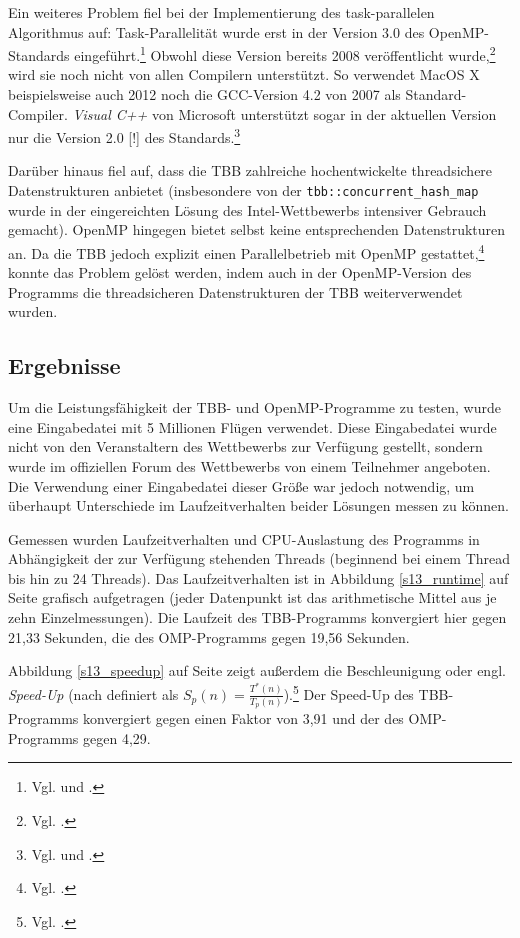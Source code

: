\documentclass[11pt]{scrartcl}
\begin{document}
Ein weiteres Problem fiel bei der Implementierung des task-parallelen Algorithmus auf: Task-Parallelität wurde erst in
der Version 3.0 des OpenMP-Standards eingeführt.\footnote{Vgl. \cite[S.~134]{openmp08} und
\cite[S.~406ff]{ayguade_design_2009}.} Obwohl diese Version bereits 2008 veröffentlicht wurde,\footnote{Vgl.
\cite{openmp.org_openmp_2012}.} wird sie noch nicht von allen Compilern unterstützt. So verwendet MacOS X
beispielsweise auch 2012 noch die GCC-Version 4.2 von 2007 als Standard-Compiler. \emph{Visual C++} von Microsoft
unterstützt sogar in der aktuellen Version nur die Version 2.0 [!] des Standards.\footnote{Vgl.
\cite{openmp.org_openmp_2012-2} und
\cite{microsoft_openmp_2012}.}

Darüber hinaus fiel auf, dass die TBB zahlreiche hochentwickelte threadsichere Datenstrukturen anbietet (insbesondere
von der \texttt{tbb::concurrent\_hash\_map} wurde in der eingereichten Lösung des Intel-Wettbewerbs intensiver Gebrauch
gemacht). OpenMP hingegen bietet selbst keine entsprechenden Datenstrukturen an. Da die TBB jedoch explizit einen
Parallelbetrieb mit OpenMP gestattet,\footnote{Vgl. \cite{intel_mixing_2012}.} konnte das Problem gelöst werden, indem
auch in der OpenMP-Version des Programms die threadsicheren Datenstrukturen der TBB weiterverwendet wurden.

\subsection{Ergebnisse}

Um die Leistungsfähigkeit der TBB- und OpenMP-Programme zu testen, wurde eine Eingabedatei mit 5 Millionen Flügen
verwendet. Diese Eingabedatei wurde nicht von den Veranstaltern des Wettbewerbs zur Verfügung gestellt, sondern wurde im
offiziellen Forum des Wettbewerbs von einem Teilnehmer angeboten. Die Verwendung einer Eingabedatei dieser Größe war
jedoch notwendig, um überhaupt Unterschiede im Laufzeitverhalten beider Lösungen messen zu können.

Gemessen wurden Laufzeitverhalten und CPU-Auslastung des Programms in Abhängigkeit der zur Verfügung stehenden
Threads (beginnend bei einem Thread bis hin zu 24 Threads). Das Laufzeitverhalten ist in Abbildung \ref{s13_runtime}
auf Seite \pageref{s13_runtime} grafisch aufgetragen (jeder Datenpunkt ist das arithmetische Mittel aus je zehn
Einzelmessungen). Die Laufzeit des TBB-Programms konvergiert hier gegen 21,33 Sekunden, die des OMP-Programms gegen
19,56 Sekunden.

Abbildung \ref{s13_speedup} auf Seite \pageref{s13_speedup} zeigt außerdem die Beschleunigung oder engl. \emph{Speed-Up} (nach
 definiert als $S_p(n) = \frac{T^*(n)}{T_p(n)}$).\footnote{Vgl.
\cite[S.~162]{rauber_parallel_2010}.} Der Speed-Up des TBB-Programms konvergiert gegen einen Faktor von 3,91 und der des
OMP-Programms gegen 4,29.
\end{document}

